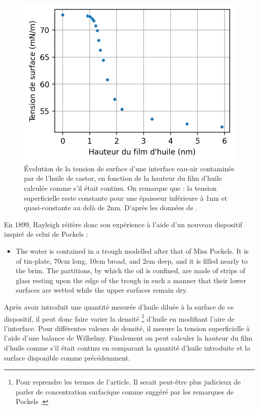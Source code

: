 \documentclass[12pt,a4paper]{article}
\begin{document}
\begin{figure}
\center
\includegraphics[scale=1]{rayleigh99.png}
\caption{Évolution de la tension de surface d'une interface eau-air contaminée par de l'huile de castor, en fonction de la hauteur du film d'huile calculée comme s'il était continu.
On remarque que : la tension superficielle reste constante pour une épaisseur inférieure à \unit{1}{nm} et quasi-constante au delà de \unit{2}{nm}.
D'après les données de \cite{Rayleigh1899}.}
\label{fig:rayleigh99}
\end{figure}

En 1899, Rayleigh réitère donc son expérience à l'aide d'un nouveau dispositif inspiré de celui de Pockels :
\begin{itemize}
\item[]
\og 
The water is contained in a trough modelled after that of Miss Pockels.
It is of tin-plate, \unit{70}{cm} long, \unit{10}{cm} broad, and \unit{2}{cm} deep, and it is filled nearly to the brim.
The partitions, by which the oil is confined, are made of strips of glass resting upon the edge of the trough in such a manner that their lower surfaces are wetted while the upper surfaces remain dry.
\fg{}
\end{itemize}
Après avoir introduit une quantité mesurée d'huile diluée à la surface de ce dispositif, il peut donc faire varier la \og densité \fg{}\footnote{Pour reprendre les termes de l'article.
Il serait peut-être plus judicieux de parler de concentration surfacique comme suggéré par les remarques de Pockels \cite{Pockels1891}.} d'huile en modifiant l'aire de l'interface.
Pour différentes valeurs de densité, il mesure la tension superficielle à l'aide d'une balance de Wilhelmy.
Finalement on peut calculer la hauteur du film d'huile comme s'il était continu en comparant la quantité d'huile introduite et la surface disponible comme précédemment.
\end{document}

